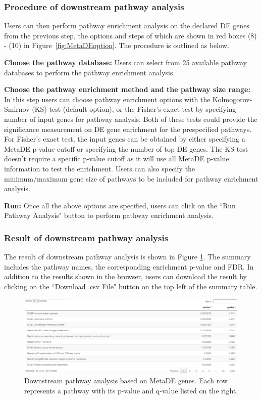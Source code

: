 \subsubsection{Procedure of downstream pathway analysis}
Users can then perform pathway enrichment analysis on the declared DE genes from the previous step, 
the options and steps of which are shown in {\color{red} red boxes (8) - (10)} in Figure~\ref{fig:MetaDEoption}.
The procedure is outlined as below.

\begin{steps}
\item \textbf{Choose the pathway database:}
Users can select from 25 available pathway databases to perform the pathway enrichment analysis. 

\item \textbf{Choose the pathway enrichment method and the pathway size range:}
In this step users can choose pathway enrichment options with the Kolmogorov-Smirnov (KS) test (default option),
or the Fisher's exact test by specifying number of input genes for pathway analysis.
Both of these tests could provide the significance measurement on DE gene enrichment for the prespecified pathways.
For Fisher's exact test, the input genes can be obtained by either specifying a MetaDE p-value cutoff 
or specifying the number of top DE genes.
The KS-test doesn't require a specific p-value cutoff as it will use all MetaDE p-value information to test the enrichment.
Users can also specify the minimum/maximum gene size of pathways to be included for pathway enrichment analysis.

\item \textbf{Run:}
Once all the above options are specified, users can click on the ``Run Pathway Analysis" button to perform pathway enrichment analysis.

\end{steps}


\subsubsection{Result of downstream pathway analysis}

The result of downstream pathway analysis is shown in Figure \ref{fig:MetaDEresult2}. 
The summary includes the pathway names, the corresponding enrichment p-value and FDR. 
In addition to the results shown in the browser, 
users can download the result by clicking on the ``Download .csv File" button on the top left of the summary table. 

\begin{figure}[H]
\begin{center}
\includegraphics[scale=0.5]{./figure/metaDE/MetaDE_pathway.pdf}
\caption{Downstream pathway analysis based on MetaDE genes.
Each row represents a pathway with its p-value and q-value listed on the right.
}
\label{fig:MetaDEresult2}
\end{center}
\end{figure}



